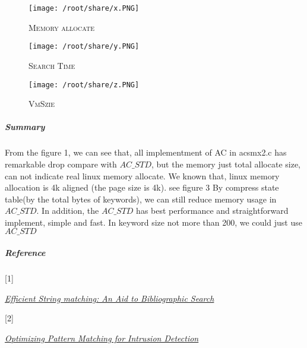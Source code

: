 \documentclass{article}
\begin{document}
\begin{figure}[h]
\caption{\textsc{Memory allocate}}
\texttt{[image: /root/share/x.PNG]}
\end{figure}

\begin{figure}[h]
\caption{\textsc{Search Time}}
\texttt{[image: /root/share/y.PNG]}
\end{figure}

\begin{figure}[h]
\caption{\textsc{VmSzie}}
\texttt{[image: /root/share/z.PNG]}
\end{figure}


\subparagraph{Summary}

From the figure 1, we can see that, all implementment of AC in acsmx2.c has remarkable drop compare with $AC\_STD$, but the memory just total allocate size, can not indicate real linux memory allocate. We known that, linux memory allocation is 4k aligned (the page size is 4k). see figure 3
By compress state table(by the total bytes of keywords), we can still reduce memory usage in $AC\_STD$. In addition, the $AC\_STD$ has best performance and straightforward implement, simple and fast. In keyword size not more than 200, we could just use $AC\_STD$


\subparagraph{Reference}
\begin{list}{}{}
  \item \hypertarget{effic}{[1]} \href{http://cr.yp.to/bib/1975/aho.pdf}{\textit{Efficient String matching: An Aid to Bibliographic Search}} \\
  \item \hypertarget{snort}{[2]} \href{http://citeseerx.ist.psu.edu/viewdoc/download?doi=10.1.1.103.4663&rep=rep1&type=pdf}{\textit{Optimizing Pattern Matching for Intrusion Detection}}
\end{list}
\end{document}
